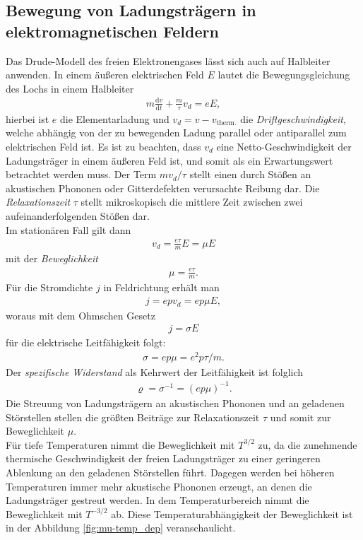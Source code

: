 \documentclass[a4paper,12pt]{article}
\begin{document}
\subsection{Bewegung von Ladungsträgern in elektromagnetischen Feldern}
Das Drude-Modell des freien Elektronengases lässt sich auch auf Halbleiter anwenden. In einem äußeren elektrischen Feld $E$ lautet die Bewegungsgleichung des Lochs in einem Halbleiter
\begin{align}
m\frac{\mathrm{d}v}{\mathrm{d}t}+\frac{m}{\tau}v_d=eE,
\end{align}
hierbei ist $e$ die Elementarladung und $v_d=v-v_\text{therm.}$ die \emph{Driftgeschwindigkeit}, welche abhängig von der zu bewegenden Ladung parallel oder antiparallel zum elektrischen Feld ist.
Es ist zu beachten, dass $v_d$ eine Netto-Geschwindigkeit der Ladungsträger in einem äußeren Feld ist, und somit als ein Erwartungswert betrachtet werden muss.
Der Term $mv_d/\tau$ stellt einen durch Stößen an akustischen Phononen oder Gitterdefekten verursachte Reibung dar. Die \emph{Relaxationszeit} $\tau$ stellt mikroskopisch die mittlere Zeit zwischen zwei aufeinanderfolgenden Stößen dar.\\
Im stationären Fall gilt dann
\begin{align}
v_d=\frac{e\tau}{m}E=\mu E
\end{align}
mit der \emph{Beweglichkeit}
\begin{align}
\mu=\frac{e\tau}{m}.
\end{align}
Für die Stromdichte $j$ in Feldrichtung erhält man
\begin{align}
j=epv_d=ep\mu E,
\end{align}
woraus mit dem Ohmschen Gesetz
\begin{align}
j=\sigma E
\end{align}
für die elektrische Leitfähigkeit folgt:
\begin{align}
\sigma=ep\mu=e^2p\tau/m.
\end{align}
Der \emph{spezifische Widerstand} als Kehrwert der Leitfähigkeit ist folglich
\begin{align}
\varrho=\sigma^{-1}=(ep\mu)^{-1}.
\end{align}
Die Streuung von Ladungsträgern an akustischen Phononen und an geladenen Störstellen stellen die größten Beiträge zur Relaxationszeit $\tau$ und somit   zur Beweglichkeit $\mu$.\\
Für tiefe Temperaturen nimmt die Beweglichkeit mit $T^{3/2}$ zu, da die zunehmende thermische Geschwindigkeit der freien Ladungsträger zu einer geringeren Ablenkung an den geladenen Störstellen führt. Dagegen werden bei höheren Temperaturen immer mehr akustische Phononen erzeugt, an denen die Ladungsträger gestreut werden. In dem Temperaturbereich nimmt die Beweglichkeit mit $T^{-3/2}$ ab. Diese Temperaturabhängigkeit der Beweglichkeit ist in der Abbildung \ref{fig:mu-temp_dep} veranschaulicht.
\end{document}
